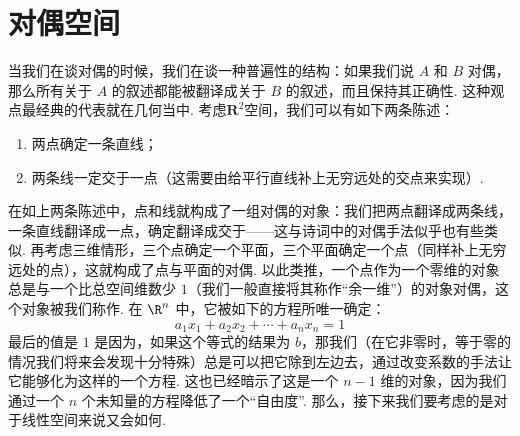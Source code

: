 \chapter{对偶空间} \label{chap:对偶空间}

当我们在谈对偶的时候，我们在谈一种普遍性的结构：如果我们说 $A$ 和 $B$ 对偶，那么所有关于 $A$ 的叙述都能被翻译成关于 $B$ 的叙述，而且保持其正确性. 这种观点最经典的代表就在几何当中. 考虑$\mathbf{R}^2$空间，我们可以有如下两条陈述：
\begin{enumerate}
    \item 两点确定一条直线；
    \item 两条线一定交于一点（这需要由给平行直线补上无穷远处的交点来实现）.
\end{enumerate}
在如上两条陈述中，点和线就构成了一组对偶的对象：我们把两点翻译成两条线，一条直线翻译成一点，确定翻译成交于——这与诗词中的对偶手法似乎也有些类似. 再考虑三维情形，三个点确定一个平面，三个平面确定一个点（同样补上无穷远处的点），这就构成了点与平面的对偶. 以此类推，一个点作为一个零维的对象总是与一个比总空间维数少 $1$（我们一般直接将其称作“余一维”）的对象对偶，这个对象被我们称作. 在 $\R^n$ 中，它被如下的方程所唯一确定：
\[a_1 x_1 + a_2 x_2 + \cdots + a_n x_n = 1\]
最后的值是 $1$ 是因为，如果这个等式的结果为 $b$，那我们（在它非零时，等于零的情况我们将来会发现十分特殊）总是可以把它除到左边去，通过改变系数的手法让它能够化为这样的一个方程. 这也已经暗示了这是一个 $n - 1$ 维的对象，因为我们通过一个 $n$ 个未知量的方程降低了一个``自由度''. 那么，接下来我们要考虑的是对于线性空间来说又会如何.





